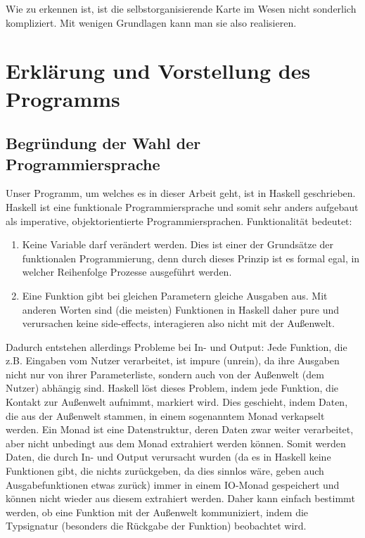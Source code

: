\documentclass[twoside,a4paper,draft]{article}
\begin{document}
Wie zu erkennen ist, ist die selbstorganisierende Karte im Wesen nicht sonderlich kompliziert. Mit wenigen Grundlagen kann man sie also realisieren.

\section{Erklärung und Vorstellung des Programms}

\subsection{Begründung der Wahl der Programmiersprache}

Unser Programm, um welches es in dieser Arbeit geht, ist in Haskell geschrieben. Haskell ist eine funktionale Programmiersprache und somit sehr anders aufgebaut als imperative, objektorientierte Programmiersprachen. Funktionalität bedeutet:

\begin{enumerate}
\item Keine Variable darf verändert werden. Dies ist einer der Grundsätze der funktionalen Programmierung, denn durch dieses Prinzip ist es formal egal, in welcher Reihenfolge Prozesse ausgeführt werden.

\item Eine Funktion gibt bei gleichen Parametern gleiche Ausgaben aus. Mit anderen Worten sind (die meisten) Funktionen in Haskell daher \glqq{}pure\grqq{} und verursachen keine \glqq{}side-effects\grqq{}, interagieren also nicht mit der Außenwelt.
\end{enumerate}

Dadurch entstehen allerdings Probleme bei In- und Output: Jede Funktion, die z.B. Eingaben vom Nutzer verarbeitet, ist \glqq{}impure\grqq{} (unrein), da ihre Ausgaben nicht nur von ihrer Parameterliste, sondern auch von der Außenwelt (dem Nutzer) abhängig sind. Haskell löst dieses Problem, indem jede Funktion, die Kontakt zur Außenwelt aufnimmt, markiert wird. Dies geschieht, indem Daten, die aus der Außenwelt stammen, in einem sogenanntem \glqq{}Monad\grqq{} verkapselt werden. Ein Monad ist eine Datenstruktur, deren Daten zwar weiter verarbeitet, aber nicht unbedingt aus dem Monad extrahiert werden können. Somit werden Daten, die durch In- und Output verursacht wurden (da es in Haskell keine Funktionen gibt, die nichts zurückgeben, da dies sinnlos wäre, geben auch Ausgabefunktionen etwas zurück) immer in einem \glqq{}IO-Monad\grqq{} gespeichert und können nicht wieder aus diesem extrahiert werden. Daher kann einfach bestimmt werden, ob eine Funktion mit der Außenwelt kommuniziert, indem die Typsignatur (besonders die Rückgabe der Funktion) beobachtet wird.
\end{document}
